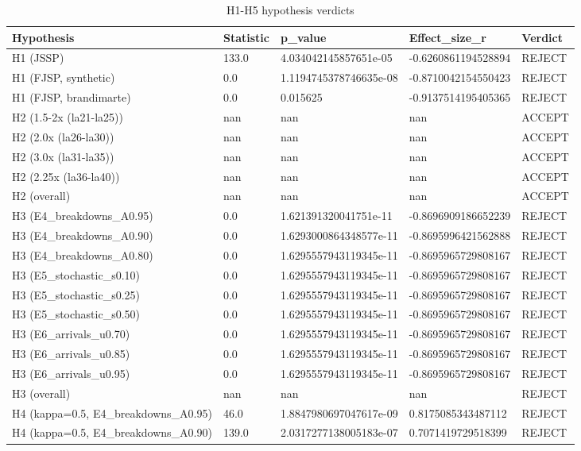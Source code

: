 \begin{table}[htbp]
\centering
\caption{H1-H5 hypothesis verdicts}
\label{tab:ch6-h1-h5-verdict}
\begin{tabular}{lllll}
\toprule
Hypothesis & Statistic & p_value & Effect_size_r & Verdict \\
\midrule
H1 (JSSP) & 133.0 & 4.034042145857651e-05 & -0.6260861194528894 & REJECT \\
H1 (FJSP, synthetic) & 0.0 & 1.1194745378746635e-08 & -0.8710042154550423 & REJECT \\
H1 (FJSP, brandimarte) & 0.0 & 0.015625 & -0.9137514195405365 & REJECT \\
H2 (1.5-2x (la21-la25)) & nan & nan & nan & ACCEPT \\
H2 (2.0x (la26-la30)) & nan & nan & nan & ACCEPT \\
H2 (3.0x (la31-la35)) & nan & nan & nan & ACCEPT \\
H2 (2.25x (la36-la40)) & nan & nan & nan & ACCEPT \\
H2 (overall) & nan & nan & nan & ACCEPT \\
H3 (E4\_breakdowns\_A0.95) & 0.0 & 1.621391320041751e-11 & -0.8696909186652239 & REJECT \\
H3 (E4\_breakdowns\_A0.90) & 0.0 & 1.6293000864348577e-11 & -0.8695996421562888 & REJECT \\
H3 (E4\_breakdowns\_A0.80) & 0.0 & 1.6295557943119345e-11 & -0.8695965729808167 & REJECT \\
H3 (E5\_stochastic\_s0.10) & 0.0 & 1.6295557943119345e-11 & -0.8695965729808167 & REJECT \\
H3 (E5\_stochastic\_s0.25) & 0.0 & 1.6295557943119345e-11 & -0.8695965729808167 & REJECT \\
H3 (E5\_stochastic\_s0.50) & 0.0 & 1.6295557943119345e-11 & -0.8695965729808167 & REJECT \\
H3 (E6\_arrivals\_u0.70) & 0.0 & 1.6295557943119345e-11 & -0.8695965729808167 & REJECT \\
H3 (E6\_arrivals\_u0.85) & 0.0 & 1.6295557943119345e-11 & -0.8695965729808167 & REJECT \\
H3 (E6\_arrivals\_u0.95) & 0.0 & 1.6295557943119345e-11 & -0.8695965729808167 & REJECT \\
H3 (overall) & nan & nan & nan & REJECT \\
H4 (kappa=0.5, E4\_breakdowns\_A0.95) & 46.0 & 1.8847980697047617e-09 & 0.8175085343487112 & REJECT \\
H4 (kappa=0.5, E4\_breakdowns\_A0.90) & 139.0 & 2.0317277138005183e-07 & 0.7071419729518399 & REJECT \\

\end{tabular}
\end{table}
